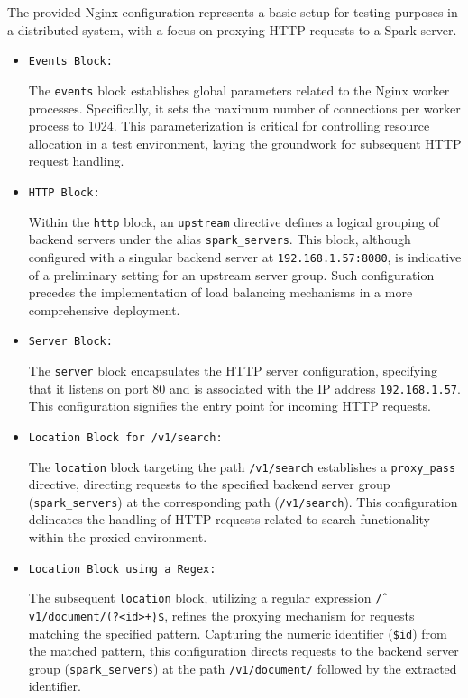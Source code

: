 \documentclass{article}
\begin{document}
The provided Nginx configuration represents a basic setup for testing purposes in a distributed system, with a focus on proxying HTTP requests to a Spark server.
\begin{itemize}
    \item \texttt{Events Block:}
    
    The \texttt{events} block establishes global parameters related to the Nginx worker processes. Specifically, it sets the maximum number of connections per worker process to 1024. This parameterization is critical for controlling resource allocation in a test environment, laying the groundwork for subsequent HTTP request handling.

    \item \texttt{HTTP Block:}

    Within the \texttt{http} block, an \texttt{upstream} directive defines a logical grouping of backend servers under the alias \texttt{spark\_servers}. This block, although configured with a singular backend server at \texttt{192.168.1.57:8080}, is indicative of a preliminary setting for an upstream server group. Such configuration precedes the implementation of load balancing mechanisms in a more comprehensive deployment.

    \item \texttt{Server Block:}

    The \texttt{server} block encapsulates the HTTP server configuration, specifying that it listens on port 80 and is associated with the IP address \texttt{192.168.1.57}. This configuration signifies the entry point for incoming HTTP requests.

    \item \texttt{Location Block for \texttt{/v1/search}:}

    The \texttt{location} block targeting the path \texttt{/v1/search} establishes a \texttt{proxy\_pass} directive, directing requests to the specified backend server group (\texttt{spark\_servers}) at the corresponding path (\texttt{/v1/search}). This configuration delineates the handling of HTTP requests related to search functionality within the proxied environment.

    \item \texttt{Location Block using a Regex:}

    The subsequent \texttt{location} block, utilizing a regular expression \texttt{\^/v1/document/(?<id>\d+)\$}, refines the proxying mechanism for requests matching the specified pattern. Capturing the numeric identifier (\texttt{\$id}) from the matched pattern, this configuration directs requests to the backend server group (\texttt{spark\_servers}) at the path \texttt{/v1/document/} followed by the extracted identifier.

    
\end{itemize}
\end{document}
